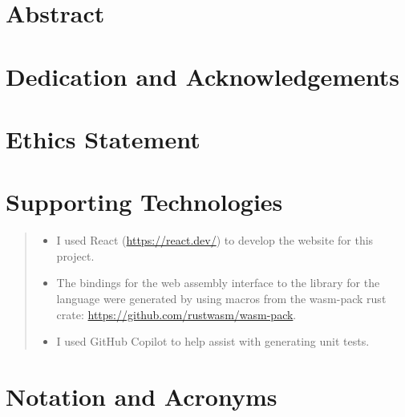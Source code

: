 \chapter*{Abstract}



\chapter*{Dedication and Acknowledgements}

\makedecl
\makeaidecl
\tableofcontents
\listoffigures
\listoftables


\chapter*{Ethics Statement}


\chapter*{Supporting Technologies}
\label{chap:supporting_tech}

\begin{quote}
\noindent
\begin{itemize}
\item I used React (\url{https://react.dev/}) to develop the website for this project.
\item The bindings for the web assembly interface to the library for the language were generated by using macros from the wasm-pack rust crate: \url{https://github.com/rustwasm/wasm-pack}.
\item I used GitHub Copilot to help assist with generating unit tests.
\end{itemize}
\end{quote}


\chapter*{Notation and Acronyms}
\begin{acronym}
\end{acronym}